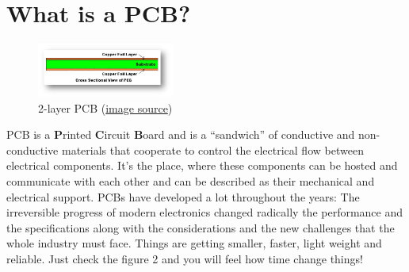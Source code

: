 \documentclass[final]{cubedoc}
\begin{document}
	\section{What is a PCB?}
	
	\begin{figure}
		\centering
		\includegraphics[width=0.4\textwidth]{assets/simple_2_layer_PCB.jpg}
		\caption{2-layer PCB \small{(\href{https://web.archive.org/web/20200813141542/https://www.edn.com/pcb-design-basics/}{image source})}}
		\label{fig:1}
	\end{figure}
	
	PCB is a \textbf{P}rinted \textbf{C}ircuit \textbf{B}oard and is  a “sandwich” of conductive and non-conductive materials that cooperate to control the electrical flow between electrical components. It’s the place, where these components can be hosted and communicate with each other and can be described as their mechanical and electrical support. PCBs have developed a lot throughout the years: The irreversible progress of modern electronics changed radically the performance and the specifications along with the considerations and the new challenges that the whole industry must face. Things are getting smaller, faster, light weight and reliable. Just check the figure 2 and you will feel how time change things!
	
	
	
\end{document}
